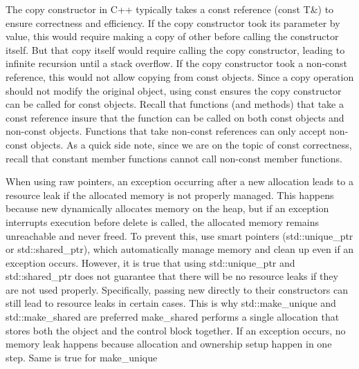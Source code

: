 \documentclass{report}
\begin{document}
    \pagebreak 
    \bigbreak \noindent 
    The copy constructor in C++ typically takes a const reference (const T\&) to ensure correctness and efficiency. If the copy constructor took its parameter by value, this would require making a copy of other before calling the constructor itself. But that copy itself would require calling the copy constructor, leading to infinite recursion until a stack overflow.
    \bigbreak \noindent 
    If the copy constructor took a non-const reference, this would not allow copying from const objects.
    \bigbreak \noindent 
    Since a copy operation should not modify the original object, using const ensures the copy constructor can be called for const objects.
    \bigbreak \noindent 
    Recall that functions (and methods) that take a const reference insure that the function can be called on both const objects and non-const objects. Functions that take non-const references can only accept non-const objects.
    \bigbreak \noindent 
    As a quick side note, since we are on the topic of const correctness, recall that constant member functions cannot call non-const member functions.

    \pagebreak 
    \bigbreak \noindent 
    When using raw pointers, an exception occurring after a new allocation leads to a resource leak if the allocated memory is not properly managed. This happens because new dynamically allocates memory on the heap, but if an exception interrupts execution before delete is called, the allocated memory remains unreachable and never freed.
    \bigbreak \noindent 
    To prevent this, use smart pointers (std::unique\_ptr or std::shared\_ptr), which automatically manage memory and clean up even if an exception occurs.
    \bigbreak \noindent 
    However, it is true that using std::unique\_ptr and std::shared\_ptr does not guarantee that there will be no resource leaks if they are not used properly. Specifically, passing new directly to their constructors can still lead to resource leaks in certain cases. This is why std::make\_unique and std::make\_shared are preferred
    \bigbreak \noindent 
    make\_shared performs a single allocation that stores both the object and the control block together. If an exception occurs, no memory leak happens because allocation and ownership setup happen in one step.
    \bigbreak \noindent 
    Same is true for make\_unique
    \bigbreak \noindent 
\end{document}
